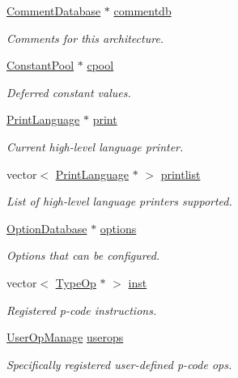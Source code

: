 \begin{DoxyCompactItemize}
\mbox{\hyperlink{class_comment_database}{Comment\+Database}} $\ast$ \mbox{\hyperlink{class_architecture_a5425576df9b7ce15b6ddddbf17b03df6}{commentdb}}
\begin{DoxyCompactList}\small\item\em Comments for this architecture. \end{DoxyCompactList}\item 
\mbox{\hyperlink{class_constant_pool}{Constant\+Pool}} $\ast$ \mbox{\hyperlink{class_architecture_adeb5761c98d8af556fb59753d68dfd97}{cpool}}
\begin{DoxyCompactList}\small\item\em Deferred constant values. \end{DoxyCompactList}\item 
\mbox{\hyperlink{class_print_language}{Print\+Language}} $\ast$ \mbox{\hyperlink{class_architecture_af72890bc88edf8d6074e24d92fd31c57}{print}}
\begin{DoxyCompactList}\small\item\em Current high-\/level language printer. \end{DoxyCompactList}\item 
vector$<$ \mbox{\hyperlink{class_print_language}{Print\+Language}} $\ast$ $>$ \mbox{\hyperlink{class_architecture_a118dbf145a9f2b6cae5d48b40f00e4d8}{printlist}}
\begin{DoxyCompactList}\small\item\em List of high-\/level language printers supported. \end{DoxyCompactList}\item 
\mbox{\hyperlink{class_option_database}{Option\+Database}} $\ast$ \mbox{\hyperlink{class_architecture_ab581a0109bda8e9206bb155a80a3a694}{options}}
\begin{DoxyCompactList}\small\item\em Options that can be configured. \end{DoxyCompactList}\item 
vector$<$ \mbox{\hyperlink{class_type_op}{Type\+Op}} $\ast$ $>$ \mbox{\hyperlink{class_architecture_a3a9badb712693d9abec7e21abc20fde1}{inst}}
\begin{DoxyCompactList}\small\item\em Registered p-\/code instructions. \end{DoxyCompactList}\item 
\mbox{\hyperlink{class_user_op_manage}{User\+Op\+Manage}} \mbox{\hyperlink{class_architecture_abd9c927fbda44de1ab46122f49248003}{userops}}
\begin{DoxyCompactList}\small\item\em Specifically registered user-\/defined p-\/code ops. \end{DoxyCompactList}\item 

\end{DoxyCompactItemize}
